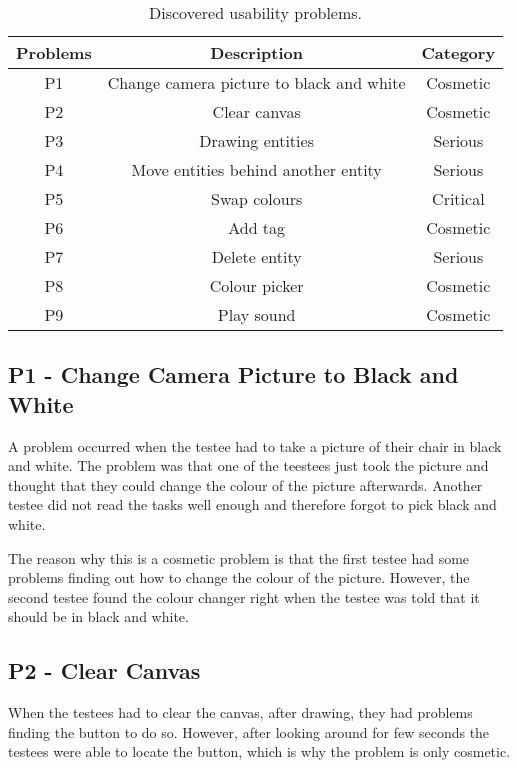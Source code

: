 \begin{table}[h]
	\centering 
	\begin{tabular}{|c|c|c|}
		\rowcolor{gray!50}
		\hline 
		Problems & Description & Category \\ 
		\hline
		P1 & Change camera picture to black and white & Cosmetic \\ 
 
		P2 & Clear canvas & Cosmetic \\ 
 
		P3 & Drawing entities & Serious \\ 

		P4 & Move entities behind another entity & Serious \\ 
 
		P5 & Swap colours & Critical \\ 
 
		P6 & Add tag & Cosmetic \\ 
 
		P7 & Delete entity & Serious \\ 
 
		P8 & Colour picker & Cosmetic \\ 
 
		P9 & Play sound & Cosmetic \\ 
		\hline 
	\end{tabular} 
	\caption{Discovered usability problems.}
	\label{tab:usability-problems}
\end{table}

\subsection*{P1 - Change Camera Picture to Black and White}
A problem occurred when the testee had to take a picture of their chair in black and white.
The problem was that one of the teestees just took the picture and thought that they could change the colour of the picture afterwards.
Another testee did not read the tasks well enough and therefore forgot to pick black and white.

The reason why this is a cosmetic problem is that the first testee had some problems finding out how to change the colour of the picture.
However, the second testee found the colour changer right when the testee was told that it should be in black and white.

\subsection*{P2 - Clear Canvas}
When the testees had to clear the canvas, after drawing, they had problems finding the button to do so.
However, after looking around for few seconds the testees were able to locate the button, which is why the problem is only cosmetic.

